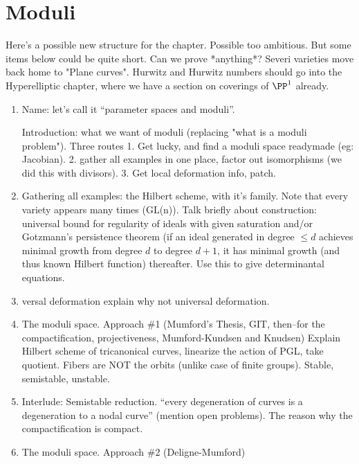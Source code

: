 

\chapter{Moduli} 
\label{Moduli chapter}\label{ModuliChapter}

Here's a possible new structure for the chapter. Possible too ambitious. But some items below could be quite short. Can we prove *anything*? Severi varieties move back home to "Plane curves". Hurwitz and Hurwitz numbers should go into the Hyperelliptic chapter, where we have a section on coverings of $\PP^1$ already.

\begin{enumerate}
 \item Name: let's call it ``parameter spaces and moduli''.
 
 Introduction: what we want of moduli (replacing "what is a moduli problem"). Three routes
 1. Get lucky, and find a moduli space readymade (eg: Jacobian). 2.  gather all examples in one place, factor out isomorphisms (we did this with divisors). 3. Get local deformation info, patch.
 
 \item Gathering all examples:  the Hilbert scheme, with it's family. Note that every variety appears many times (GL(n)). Talk briefly about construction: universal bound for regularity of ideals with given saturation and/or Gotzmann's persistence theorem (if an ideal generated in degree $\leq d$ achieves minimal growth
 from degree $d$ to degree $d+1$, it has minimal growth (and thus known Hilbert function) thereafter.
 Use this to give determinantal equations.
 
 \item versal deformation explain why not universal deformation.
 
 \item The moduli space. Approach \#1 (Mumford's Thesis, GIT, then--for the compactification, projectiveness, Mumford-Kundsen and Knudsen) Explain Hilbert scheme of tricanonical curves, linearize the action of PGL, take quotient. Fibers are NOT the orbits (unlike case of finite groups). Stable, semistable, unstable. 
 
 \item Interlude: Semistable reduction. ``every degeneration of curves is a degeneration to a nodal curve''
(mention open problems). The reason why the compactification is compact.

\item The moduli space. Approach \#2 (Deligne-Mumford)

\end{enumerate}


